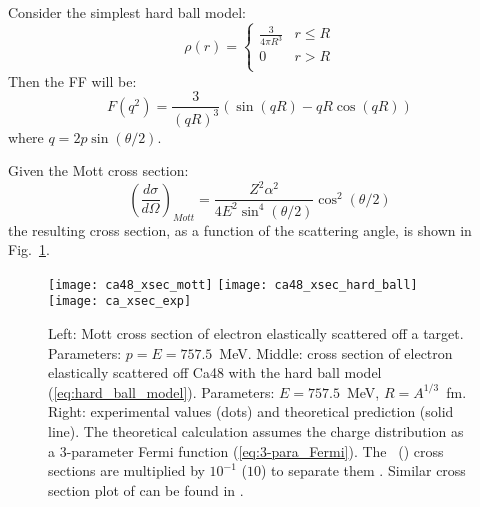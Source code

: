 Consider the simplest hard ball model:
\begin{equation}
    \rho(r) = 
    \begin{cases}
	\frac{3}{4\pi R^3}  & r \le R	\\
	0		    & r > R   \\
    \end{cases}
    \label{eq:hard_ball_model}
\end{equation}
Then the FF will be:
\begin{equation}
    F(q^2) = \frac{3}{(qR)^3} \left( \sin(qR) - qR\cos(qR) \right)
\end{equation}
where $q = 2p\sin(\theta/2)$.

Given the Mott cross section: %
\begin{equation}
    \left( \frac{d\sigma}{d\Omega} \right)_{Mott} = 
	\frac{Z^2 \alpha^2}{4E^2\sin^4(\theta/2)}\cos^2(\theta/2)   
\end{equation}
the resulting cross section, as a function of the scattering angle, is shown in Fig.~\ref{fig:ca_xsec}.
\begin{figure}
    \texttt{[image: ca48\_xsec\_mott]}
    \texttt{[image: ca48\_xsec\_hard\_ball]}
    \texttt{[image: ca\_xsec\_exp]}
    \caption{Left: Mott cross section of electron elastically scattered off a \Ca
    target. Parameters: $p=E=757.5$~MeV.
    Middle: cross section of electron elastically scattered off Ca48 with the hard ball
    model (\ref{eq:hard_ball_model}). Parameters: $E =  757.5$~MeV, $R=A^{1/3}$~fm. 
    Right: experimental values (dots) and theoretical prediction (solid line).
    The theoretical calculation assumes the charge distribution as a 3-parameter Fermi function (\ref{eq:3-para_Fermi}).
    The \Ca \ (\ca) cross sections are multiplied by $10^{-1}$ ($10$) to separate them
    \cite{PhysRevLett.19.527}. Similar cross section plot of \Pb can be found
    in \cite{PhysRevLett.38.152}.
    }
    \label{fig:ca_xsec}
\end{figure}

